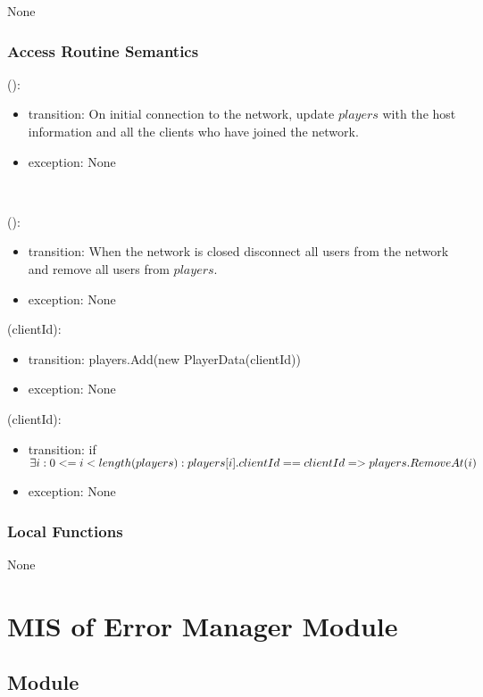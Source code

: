 \documentclass[12pt, titlepage]{article}
\begin{document}
None

\subsubsection{Access Routine Semantics}

():
\begin{itemize}
\item transition: On initial connection to the network, update $players$ with the host information and all the clients who have joined the network.
\item exception: None
\end{itemize}\

():
\begin{itemize}
\item transition: When the network is closed disconnect all users from the network and remove all users from $players$.
\item exception: None
\end{itemize}

(clientId):
\begin{itemize}
\item transition: players.Add(new PlayerData(clientId))
\item exception: None
\end{itemize}

(clientId):
\begin{itemize}
\item transition: if $  \exists i: 0 <= i < length(players) : \newline players[i].clientId == clientId => players.RemoveAt(i) $
\item exception: None
\end{itemize}

\subsubsection{Local Functions}

None

\newpage


\section{MIS of {Error Manager Module}} \label{sec:ErrorModule} 

\subsection{Module}
\end{document}
